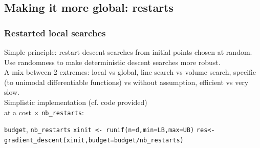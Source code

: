 \documentclass[12pt]{beamer}
\begin{document}
\subsection{Making it more global: restarts}

\begin{frame}
\frametitle{Restarted local searches} 
Simple principle: restart descent searches from initial points chosen at random.\\
Use randomness to make deterministic descent searches more robust.\\
A mix between 2 extremes: local vs global, line search vs volume search, specific (to unimodal differentiable 
functions) vs without assumption, efficient vs very slow.\\
Simplistic implementation (cf. code provided) \\
\hspace{5cm} at a cost $\times$ \texttt{nb\_restarts}:
\vspace{-0.4cm}
\begin{center}
\begin{minipage}[t]{\textwidth}
\begin{algorithmic}
\REQUIRE \texttt{budget}, \texttt{nb\_restarts}
\STATE \texttt{xinit <- runif(n=d,min=LB,max=UB)}
\STATE \texttt{res<-gradient\_descent(xinit,budget=budget/nb\_restarts)}
\ENDFOR
\end{algorithmic}
\end{minipage}
\end{center}
\end{frame}
\end{document}
